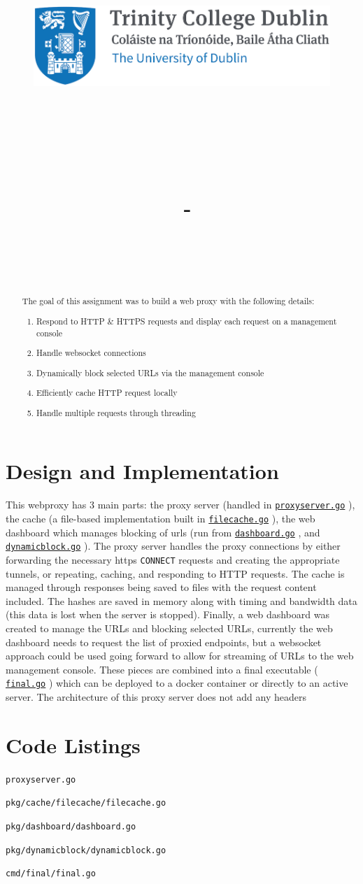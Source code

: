 \documentclass{article}
\title{
    \vspace{-1in}
    \begin{figure}[!ht]
    \flushleft
    \includegraphics[width=0.4\linewidth]{reduced-trinity.png}
    \end{figure}
    \vspace{-0.5cm}
    \hrulefill \\
    \vspace{1cm}
    \textmd{\textbf{\moduleCode\ \moduleName}}\\
    \textmd{\textbf{\assignmentTitle}}\\
    \textmd{\authorName\ - \authorID}\\
    \textmd{\reportDate}\\
    \vspace{0.5cm}
    \hrulefill \\
}
\date{}
\author{}
\newcommand{\code}[1]{\colorbox{light-gray}{\texttt{#1}}}
\newcommand{\codelisting}[2]{
  \code{#1}
  \label{code:#2}
  
  \vspace{2em}
}
\newcommand{\coderef}[1]{
  \hyperref[code:#1]{\code{#1}}
}
\begin{document}
    \lstset{language=bash, float=h, captionpos=b, frame=single, numbers=left, numberblanklines=false, numberstyle=\tiny, numbersep=1mm, framexleftmargin=3mm, xleftmargin=5mm, aboveskip=3mm, breaklines=true}
    \captionsetup{width=.8\linewidth} 

    \maketitle
    \begin{abstract}
      The goal of this assignment was to build a web proxy with the following details:
      \begin{enumerate}
        \item Respond to HTTP \& HTTPS requests and display each request on a management console
        \item Handle websocket connections
        \item Dynamically block selected URLs via the management console
        \item Efficiently cache HTTP request locally
        \item Handle multiple requests through threading
      \end{enumerate}
    \end{abstract}
    \tableofcontents
    \newpage
    
    \section{Design and Implementation}
    \label{sec:Design}
    This webproxy has 3 main parts: the proxy server (handled in \coderef{proxyserver.go}), the cache (a file-based implementation built in \coderef{filecache.go}), the web dashboard which manages blocking of urls (run from \coderef{dashboard.go}, and \coderef{dynamicblock.go}). 
    The proxy server handles the proxy connections by either forwarding the necessary https \code{CONNECT} requests and creating the appropriate tunnels, or repeating, caching, and responding to HTTP requests. 
    The cache is managed through responses being saved to files with the request content included. The hashes are saved in memory along with timing and bandwidth data (this data is lost when the server is stopped). Finally, a web dashboard was created to manage the URLs and blocking selected URLs, currently the web dashboard needs to request the list of proxied endpoints, but a websocket approach could be used going forward to allow for streaming of URLs to the web management console.
    These pieces are combined into a final executable (\coderef{final.go}) which can be deployed to a docker container or directly to an active server. The architecture of this proxy server does not add any headers 
    \newpage
    \section{Code Listings}
    \label{sec:codeListing}
    \codelisting{proxyserver.go}{proxyserver.go}
    \codelisting{pkg/cache/filecache/filecache.go}{filecache.go}
    \codelisting{pkg/dashboard/dashboard.go}{dashboard.go}
    \codelisting{pkg/dynamicblock/dynamicblock.go}{dynamicblock.go}
    \codelisting{cmd/final/final.go}{final.go}
\end{document}
